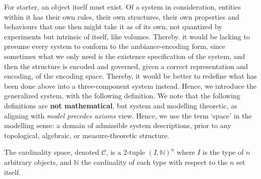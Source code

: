 For starter, an object itself must exist. Of a system in consideration, entities within it has their own rules, their own structures, their own properties and behaviours that one then might take it as of its own, not quantized by experiments but intrinsic of itself, like volumes. Thereby. it would be lacking to presume every system to conform to the ambiance-encoding form, since sometimes what we only need is the existence specification of the system, and then the structure is encoded and governed, given a correct representation and encoding, of the encoding space. Thereby, it would be better to redefine what has been done above into a three-component system instead. Hence, we introduce the generalized system, with the following definition. We note that the following definitions are \textbf{not mathematical}, but system and modelling theoretic, as aligning with \textit{model precedes axioms} view. Hence, we use the term `space' in the modelling sense: a domain of admissible system descriptions, prior to any topological, algebraic, or measure-theoretic structure.

\begin{definition}
  The cardinality space, denoted $\mathcal{C}$, is a 2-tuple $(I,\mathbb{N})^{n}$ where $I$ is the type of $n$ arbitrary objects, and $\mathbb{N}$ the cardinality of each type with respect to the $n$ set itself. 
\end{definition}

